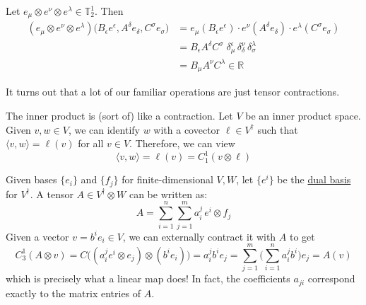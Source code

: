 	\begin{example}
	  \label{ex:evaluation-of-rank-1-2-tensor}
    Let $e_{\mu} \otimes e^{\nu} \otimes e^{\lambda} \in \mathbb{T}^{1}_{2}$. Then 
    \begin{align*}
    (e_{\mu} \otimes e^{\nu} \otimes e^{\lambda}) \big( B_{\epsilon} e ^{\epsilon}, A^{\delta} e_{\delta}, C^{\sigma} e_{\sigma} \big) & = e_{\mu} (B_{\epsilon} e^{\epsilon}) \cdot e^{\nu} (A^{\delta} e_{\delta}) \cdot e^{\lambda} (C^\sigma e_{\sigma}) \\
     & = B_{\epsilon} A^{\delta} C^{\sigma} \; \delta_{\mu}^{\epsilon} \, \delta_{\delta}^{\nu} \, \delta_{\sigma}^{\lambda} \\
     & = B_{\mu} A^{\nu} C^{\lambda} \in \mathbb{R} 
     \end{align*}
  \end{example}

	It turns out that a lot of our familiar operations are just tensor contractions. 

	\begin{example}
	  \label{ex:inner-product}
		The inner product is (sort of) like a contraction. Let $V$ be an inner product space. Given $v, w \in V$, we can identify $w$ with a covector $\ell \in V^\dagger$ such that $\langle v, w \rangle = \ell(v)$ for all $v \in V$. Therefore, we can view 
		\begin{equation}
			\langle v, w \rangle = \ell(v) = C^1_1 (v \otimes \ell)
		\end{equation}
	\end{example}

	\begin{example}
	  \label{ex:linear-maps}
		Given bases $\{e_i\}$ and $\{f_j\}$ for finite-dimensional $V, W$, let $\{e^i\}$ be the \hyperref[def:dual-basis]{dual basis} for $V^\dagger$. A tensor $A \in V^\dagger \otimes W$ can be written as:
		\begin{equation}
			A = \sum_{i=1}^n \sum_{j=1}^m a_i^j \, e^i \otimes f_j
		\end{equation}
		Given a vector $v = b^i e_i\in V$, we can externally contract it with $A$ to get 
		\begin{equation}
			C^1_3 (A \otimes v) = C\big( (a_i^j e^i \otimes e_j) \otimes (b^i e_i) \big) = a_i^j b^i e_j = \sum_{j=1}^{m} \bigg( \sum_{i=1}^n a_i^j b^i \bigg) e_j = A(v)
		\end{equation}
		which is precisely what a linear map does! In fact, the coefficients $a_{ji}$ correspond exactly to the matrix entries of $A$. 
	\end{example}

